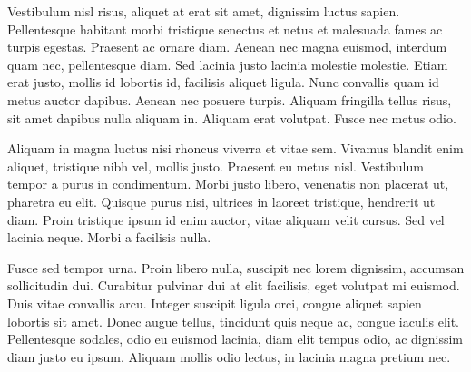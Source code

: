 Vestibulum nisl risus, aliquet at erat sit amet, dignissim luctus sapien. Pellentesque habitant morbi tristique senectus et netus et malesuada fames ac turpis egestas. Praesent ac ornare diam. Aenean nec magna euismod, interdum quam nec, pellentesque diam. Sed lacinia justo lacinia molestie molestie. Etiam erat justo, mollis id lobortis id, facilisis aliquet ligula. Nunc convallis quam id metus auctor dapibus. Aenean nec posuere turpis. Aliquam fringilla tellus risus, sit amet dapibus nulla aliquam in. Aliquam erat volutpat. Fusce nec metus odio.

Aliquam in magna luctus nisi rhoncus viverra et vitae sem. Vivamus blandit enim aliquet, tristique nibh vel, mollis justo. Praesent eu metus nisl. Vestibulum tempor a purus in condimentum. Morbi justo libero, venenatis non placerat ut, pharetra eu elit. Quisque purus nisi, ultrices in laoreet tristique, hendrerit ut diam. Proin tristique ipsum id enim auctor, vitae aliquam velit cursus. Sed vel lacinia neque. Morbi a facilisis nulla.

Fusce sed tempor urna. Proin libero nulla, suscipit nec lorem dignissim, accumsan sollicitudin dui. Curabitur pulvinar dui at elit facilisis, eget volutpat mi euismod. Duis vitae convallis arcu. Integer suscipit ligula orci, congue aliquet sapien lobortis sit amet. Donec augue tellus, tincidunt quis neque ac, congue iaculis elit. Pellentesque sodales, odio eu euismod lacinia, diam elit tempus odio, ac dignissim diam justo eu ipsum. Aliquam mollis odio lectus, in lacinia magna pretium nec.


